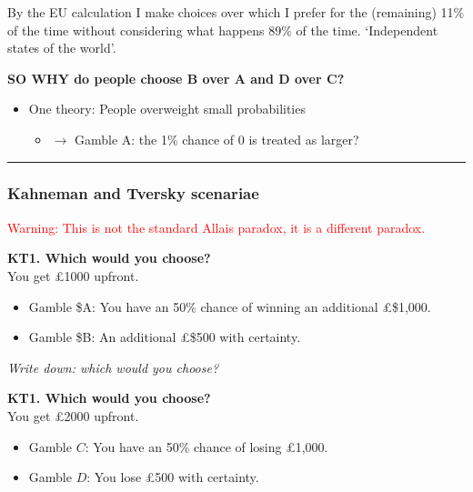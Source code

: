 \documentclass[]{article}
\providecommand{\tightlist}{%
  \setlength{\itemsep}{0pt}\setlength{\parskip}{0pt}}
\begin{document}
By the EU calculation I make choices over which I prefer for the (remaining)
11\% of the time without considering what happens 89\% of the time. `Independent states of the world'.

\textbf{SO WHY do people choose B over A and D over C?}

\begin{itemize}
\tightlist
\item
  One theory: People overweight small probabilities

  \begin{itemize}
  \tightlist
  \item
    \(\rightarrow\) Gamble A: the 1\% chance of 0 is treated as larger?
  \end{itemize}
\end{itemize}

\begin{center}\rule{0.5\linewidth}{\linethickness}\end{center}

\hypertarget{kahneman-and-tversky-scenariae}{%
\subsubsection{Kahneman and Tversky scenariae}\label{kahneman-and-tversky-scenariae}}

\textcolor{red}{Warning: This is not the standard Allais paradox, it is a different paradox.}

\textbf{KT1. Which would you choose?}\\

You get \pounds1000 upfront.\\

\begin{itemize}
\item
  Gamble \$A: You have an 50\% chance of winning an additional \pounds\$1,000.
\item
  Gamble \$B: An additional \pounds\$500 with certainty.
\end{itemize}

\emph{Write down: which would you choose?}

\hrulefill

\bigskip

\textbf{KT1. Which would you choose?}\\

You get \pounds2000 upfront.\\

\begin{itemize}
\item
  Gamble \(C\): You have an 50\% chance of losing \pounds1,000.
\item
  Gamble \(D\): You lose \pounds500 with certainty.
\end{itemize}
\end{document}
